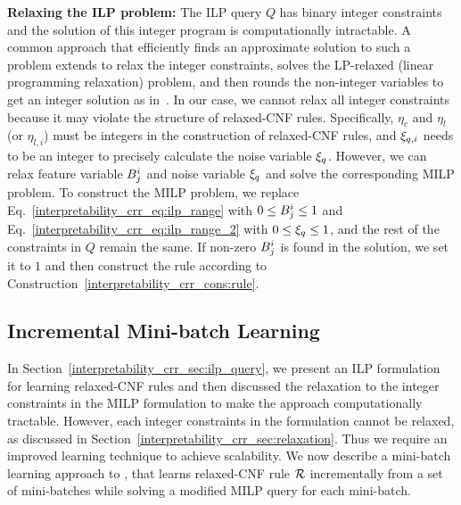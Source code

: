 

\textbf{Relaxing the ILP problem:}
\label{interpretability_crr_sec:relaxation}
The ILP query $ Q $ has binary integer constraints and the solution of this integer program is computationally intractable. 
A common approach that efficiently finds an approximate solution to such a problem extends to relax the integer constraints,  solves the LP-relaxed (linear programming relaxation) problem, and then rounds the non-integer variables to get an integer solution as in~\cite{malioutov2013exact}. 
In our case, we cannot relax all integer constraints because it may violate the structure of relaxed-CNF rules. Specifically, $ \eta_c $ and $ \eta_l $ (or $ \eta_{l,i} $) must be integers in the construction of relaxed-CNF rules, and $ \xi_{q,i} $ needs to be an integer to precisely calculate the noise variable $ \xi_q $.  However,  we can relax feature variable $ B^i_j $ and noise variable $ \xi_q $ and solve the corresponding MILP  problem.  To construct the MILP problem, we replace Eq.~\ref{interpretability_crr_eq:ilp_range} with $ 0 \le B^i_j \le 1 $ and Eq.~\ref{interpretability_crr_eq:ilp_range_2} with $ 0 \le \xi_q \le 1 $, and the rest of the constraints in $ Q $ remain the same.  If non-zero $ B^i_j $ is found in the solution, we set it to $ 1 $ and then construct the rule according to Construction~\ref{interpretability_crr_cons:rule}.






	



\subsection{Incremental Mini-batch Learning}
\label{interpretability_crr_sec:inc_ilp}

In Section~\ref{interpretability_crr_sec:ilp_query}, we  present an ILP formulation for learning relaxed-CNF rules and then discussed the relaxation to the integer constraints in the MILP formulation to make the approach computationally tractable. However, each integer constraints in the formulation cannot be relaxed, as discussed  in Section~\ref{interpretability_crr_sec:relaxation}. Thus we require an improved learning technique to achieve scalability. We now describe a mini-batch learning approach to {\crr}, that learns relaxed-CNF rule $ {\mathcal{R}} $ incrementally from a set of mini-batches while solving a modified MILP query for each mini-batch.



